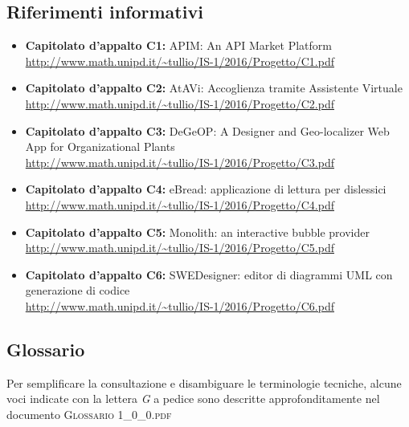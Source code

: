 \subsection{Riferimenti informativi}
\begin{itemize}
	\item \textbf{Capitolato d'appalto C1:} APIM: An API Market Platform \\ \url{http://www.math.unipd.it/~tullio/IS-1/2016/Progetto/C1.pdf}
	\item \textbf{Capitolato d'appalto C2:} AtAVi: Accoglienza tramite Assistente Virtuale \\ \url{http://www.math.unipd.it/~tullio/IS-1/2016/Progetto/C2.pdf}
	\item \textbf{Capitolato d'appalto C3:} DeGeOP: A Designer and Geo-localizer Web App for Organizational Plants \\
	\url{http://www.math.unipd.it/~tullio/IS-1/2016/Progetto/C3.pdf}
	\item \textbf{Capitolato d'appalto C4:} eBread: applicazione di lettura per dislessici \\
	\url{http://www.math.unipd.it/~tullio/IS-1/2016/Progetto/C4.pdf}
	\item \textbf{Capitolato d'appalto C5:} Monolith: an interactive bubble provider \\
	\url{http://www.math.unipd.it/~tullio/IS-1/2016/Progetto/C5.pdf}
	\item \textbf{Capitolato d'appalto C6:} SWEDesigner: editor di diagrammi UML con generazione di codice \\
	\url{http://www.math.unipd.it/~tullio/IS-1/2016/Progetto/C6.pdf}
\end{itemize}

\subsection{Glossario}
Per semplificare la consultazione e disambiguare le terminologie tecniche, alcune voci indicate con la lettera \textit{G} a pedice sono descritte approfonditamente nel documento \textsc{Glossario 1\_0\_0.pdf}